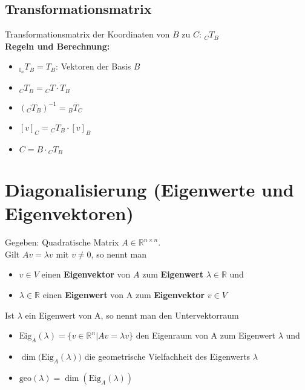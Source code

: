 \documentclass[german, 6pt]{latex4ei/latex4ei_sheet}
\begin{document}
\subsection{Transformationsmatrix}
Transformationsmatrix der Koordinaten von $B$ zu $C$: $_CT_B$\\
\textbf{Regeln und Berechnung:}
\begin{itemize}\itemsep2pt
	\item $_{\mathbb{I}_n}T_B = T_B$: Vektoren der Basis $B$
	\item $_CT_B = {_CT} \cdot T_B$
	\item $(_CT_B)^{-1} = {_BT_C}$
	\item $[v]_C = {_CT_B}\cdot[v]_B$
	\item $C=B\cdot {_CT_B}$
\end{itemize}
\begin{minipage}{\columnwidth}
\section{Diagonalisierung (Eigenwerte und Eigenvektoren)}
Gegeben: Quadratische Matrix $A \in \mathbb{R}^{n\times n}$.\\
Gilt $Av = \lambda v$ mit $v\ne 0$, so nennt man
\begin{itemize}\itemsep0pt
\item $v\in V$ einen \textbf{Eigenvektor} von $A$ zum \textbf{Eigenwert} $\lambda \in \mathbb{R}$ und 
\item $\lambda \in \mathbb{R}$ einen \textbf{Eigenwert} von A zum \textbf{Eigenvektor} $v\in V$
\end{itemize}
Ist $\lambda$ ein Eigenwert von A, so nennt man den Untervektorraum
\begin{itemize}\itemsep0pt
\item $\text{Eig}_A(\lambda) = \{v \in \mathbb{R}^n | Av = \lambda v\}$ den Eigenraum von A zum Eigenwert $\lambda$ und
\item $\dim({\text{Eig}_A(\lambda))}$ die geometrische Vielfachheit des Eigenwerts $\lambda$
\item $\text{geo}(\lambda) = \dim(\text{Eig}_A(\lambda))$ \\
\end{itemize}
\end{minipage}
\end{document}
